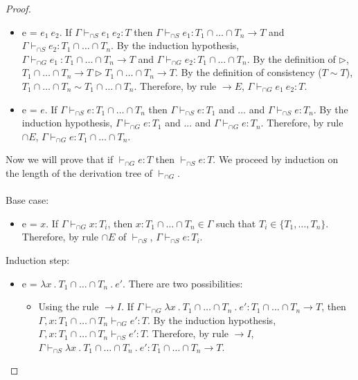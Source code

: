 \documentclass[a4paper]{article}
\begin{document}
\begin{proof}
\begin{itemize}
    \item e = $e_1\ e_2$.
    If $\Gamma \vdash_{\cap S} e_1\ e_2 : T$ then $\Gamma \vdash_{\cap S} e_1 : T_1 \cap \ldots \cap T_n \rightarrow T$ and $\Gamma \vdash_{\cap S} e_2 : T_1 \cap \ldots \cap T_n$.
    By the induction hypothesis, $\Gamma \vdash_{\cap G} e_1\ : T_1 \cap \ldots \cap T_n \rightarrow T$ and $\Gamma \vdash_{\cap G} e_2 : T_1 \cap \ldots \cap T_n$.
    By the definition of $\rhd$, $T_1 \cap \ldots \cap T_n \rightarrow T \rhd T_1 \cap \ldots \cap T_n \rightarrow T$.
    By the definition of consistency ($T \sim T$), $T_1 \cap \ldots \cap T_n \sim T_1 \cap \ldots \cap T_n$.
    Therefore, by rule ${\rightarrow} E$, $\Gamma \vdash_{\cap G} e_1\ e_2 : T$.
    \item e = $e$.
    If $\Gamma \vdash_{\cap S} e : T_1 \cap \ldots \cap T_n$ then $\Gamma \vdash_{\cap S} e : T_1$ and ... and $\Gamma \vdash_{\cap S} e : T_n$.
    By the induction hypothesis, $\Gamma \vdash_{\cap G} e : T_1$ and ... and $\Gamma \vdash_{\cap G} e : T_n$.
    Therefore, by rule ${\cap} E$, $\Gamma \vdash_{\cap G} e : T_1 \cap \ldots \cap T_n$.\\
\end{itemize}
Now we will prove that if $\vdash_{\cap G} e : T$ then $\vdash_{\cap S} e : T$.
We proceed by induction on the length of the derivation tree of $\vdash_{\cap G}$.\\\\
Base case:
\begin{itemize}
    \item e = $x$.
    If $\Gamma \vdash_{\cap G} x : T_i$, then $x : T_1 \cap \ldots \cap T_n \in \Gamma$ such that $T_i \in \{T_1, \ldots, T_n\}$.
    Therefore, by rule $\cap E$ of $\vdash_{\cap S}$, $\Gamma \vdash_{\cap S} e : T_i$.\\
\end{itemize}
Induction step:
\begin{itemize}
    \item e = $\lambda x\ .\ T_1 \cap \ldots \cap T_n\ .\ e'$.
    There are two possibilities:
    \begin{itemize}
        \item Using the rule ${\rightarrow} I$.
        If $\Gamma \vdash_{\cap G} \lambda x\ .\ T_1 \cap \ldots \cap T_n\ .\ e' : T_1 \cap \ldots \cap T_n \rightarrow T$, then $\Gamma, x : T_1 \cap \ldots \cap T_n \vdash_{\cap G} e' : T$.
        By the induction hypothesis, $\Gamma, x : T_1 \cap \ldots \cap T_n \vdash_{\cap S} e' : T$.
        Therefore, by rule ${\rightarrow} I$, $\Gamma \vdash_{\cap S} \lambda x\ .\ T_1 \cap \ldots \cap T_n\ .\ e' : T_1 \cap \ldots \cap T_n \rightarrow T$.

\end{itemize}
\end{itemize}
\end{proof}
\end{document}
